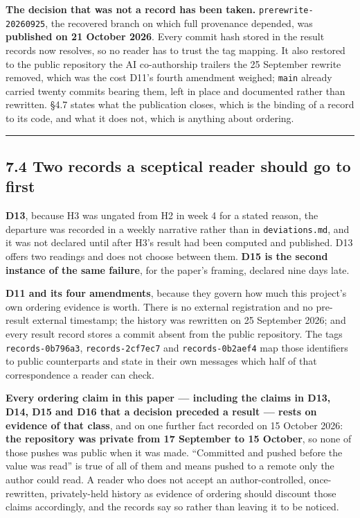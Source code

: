 \documentclass[
  10pt,
]{article}
\newcounter{none} %
\begin{document}
\textbf{The decision that was not a record has been taken.}
\texttt{prerewrite-20260925}, the recovered branch on which full
provenance depended, was \textbf{published on 21 October 2026}. Every
commit hash stored in the result records now resolves, so no reader has
to trust the tag mapping. It also restored to the public repository the
AI co-authorship trailers the 25 September rewrite removed, which was
the cost D11's fourth amendment weighed; \texttt{main} already carried
twenty commits bearing them, left in place and documented rather than
rewritten. \S{}4.7 states what the publication closes, which is the
binding of a record to its code, and what it does not, which is anything
about ordering.

\begin{center}\rule{0.5\linewidth}{0.5pt}\end{center}

\subsection{7.4 Two records a sceptical reader should go to
first}\label{two-records-a-sceptical-reader-should-go-to-first}

\textbf{D13}, because H3 was ungated from H2 in week 4 for a stated
reason, the departure was recorded in a weekly narrative rather than in
\texttt{deviations.md}, and it was not declared until after H3's result
had been computed and published. D13 offers two readings and does not
choose between them. \textbf{D15 is the second instance of the same
failure}, for the paper's framing, declared nine days late.

\textbf{D11 and its four amendments}, because they govern how much this
project's own ordering evidence is worth. There is no external
registration and no pre-result external timestamp; the history was
rewritten on 25 September 2026; and every result record stores a commit
absent from the public repository. The tags \texttt{records-0b796a3},
\texttt{records-2cf7ec7} and \texttt{records-0b2aef4} map those
identifiers to public counterparts and state in their own messages which
half of that correspondence a reader can check.

\textbf{Every ordering claim in this paper --- including the claims in
D13, D14, D15 and D16 that a decision preceded a result --- rests on
evidence of that class}, and on one further fact recorded on 15 October
2026: \textbf{the repository was private from 17 September to 15
October}, so none of those pushes was public when it was made.
``Committed and pushed before the value was read'' is true of all of
them and means pushed to a remote only the author could read. A reader
who does not accept an author-controlled, once-rewritten, privately-held
history as evidence of ordering should discount those claims
accordingly, and the records say so rather than leaving it to be
noticed.
\end{document}
